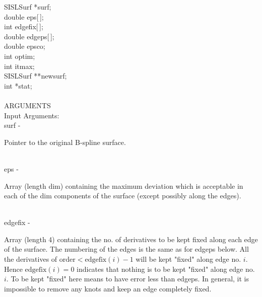                 \>\>    SISLSurf        \>      *{\fov surf};\\
                \>\>    double  \>      {\fov eps}[\,];\\
                \>\>    int     \>      {\fov edgefix}[\,];\\
                \>\>    double  \>      {\fov edgeps}[\,];\\
                \>\>    double  \>      {\fov epsco};\\
                \>\>    int     \>      {\fov optim};\\
                \>\>    int     \>      {\fov itmax};\\
                \>\>    SISLSurf        \>      **{\fov newsurf};\\
                \>\>    int     \>      *{\fov stat};\\
\\
ARGUMENTS\\
        \>Input Arguments:\\
        \>\>    {\fov surf}\> - \>      \begin{minipg2}
                                Pointer to the original B-spline surface.
                                \end{minipg2}\\
        \>\>    {\fov eps}\> - \>       \begin{minipg2}
                                Array (length {\fov dim}) containing the maximum
                                deviation which is acceptable in each of the dim
                                components of the surface (except possibly along the
                                edges).
                                \end{minipg2}\\[0.3ex]
        \>\>    {\fov edgefix}\> - \>   \begin{minipg2}
                                Array (length 4) containing the no. of derivatives to
                                be kept fixed along each edge of the surface. The
                                numbering of the edges is the same as for edgeps
                                below. All the derivatives of
                                $\mbox{order} < \mbox{edgefix}(i)-1$ will
                                be kept "fixed" along edge no. $i$.
                                Hence $\mbox{edgefix}(i)=0$
                                indicates that nothing is to be kept "fixed" along edge
                                no. $i$. To be kept "fixed" here means to have error less
                                than edgeps. In general, it is impossible to  remove
                                any knots and keep an edge completely fixed.
                                \end{minipg2}\\[0.3ex]
